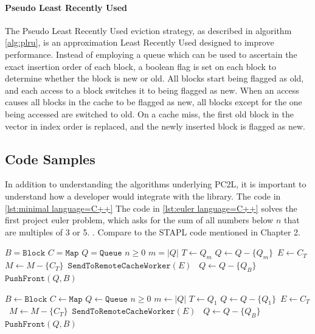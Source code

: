 \paragraph{Pseudo Least Recently Used}
The Pseudo Least Recently Used eviction strategy, as described in algorithm \ref{alg:plru}, is an approximation Least Recently Used designed to improve performance. Instead of employing a queue which can be used to ascertain the exact insertion order of each block, a boolean flag is set on each block to determine whether the block is new or old. All blocks start being flagged as old, and each access to a block switches it to being flagged as new. When an access causes all blocks in the cache to be flagged as new, all blocks except for the one being accessed are switched to old. On a cache miss, the first old block in the vector in index order is replaced, and the newly inserted block is flagged as new.


\subsection{Code Samples}

In addition to understanding the algorithms underlying PC2L, it is important to understand how a developer would integrate with the library. The code in \ref{lst:minimal language=C++} The code in \ref{lst:euler language=C++} solves the first project euler problem, which asks for the sum of all numbers below $n$ that are multiples of 3 or 5. \cite{euler_1}. Compare to the STAPL code mentioned in Chapter 2.

\begin{algorithm}
	\caption{Least Recently Used Eviction Strategy}
	\label{alg:lru}
	\begin{algorithmic}[1]
		\State $B = \texttt{Block}$
		\State $C = \texttt{Map}$
		\State $Q = \texttt{Queue}$
		\State $n \ge 0$
		\State $m = |Q|$
		\State $T \gets Q_m$
		\State $Q \gets Q - \{Q_m\}$\
		\State $E \gets C_T$\
		\State $M \gets M - \{C_T\}$\
		\State $\texttt{SendToRemoteCacheWorker}(E)$\
		\EndIf
		\Else
		\State $Q \gets Q - \{Q_B\}$
		\EndIf
		\State $\texttt{PushFront}(Q, B)$
	\end{algorithmic}
\end{algorithm}

\begin{algorithm}
	\caption{Most Recently Used Eviction Strategy}
	\label{alg:mru}
	\begin{algorithmic}[1]
		\State $B \gets \texttt{Block}$
		\State $C \gets \texttt{Map}$
		\State $Q \gets \texttt{Queue}$
		\State $n \ge 0$
		\State $m \gets |Q|$
		\If{$B \not \in C$} 
		\State $T \gets Q_1$
		\State $Q \gets Q - \{Q_1\}$\
		\State $E \gets C_T$\
		\State $M \gets M - \{C_T\}$\
		\State $\texttt{SendToRemoteCacheWorker}(E)$\
		\EndIf
		\Else
		\State $Q \gets Q - \{Q_B\}$
		\EndIf
		\State $\texttt{PushFront}(Q, B)$
	\end{algorithmic}
\end{algorithm}

